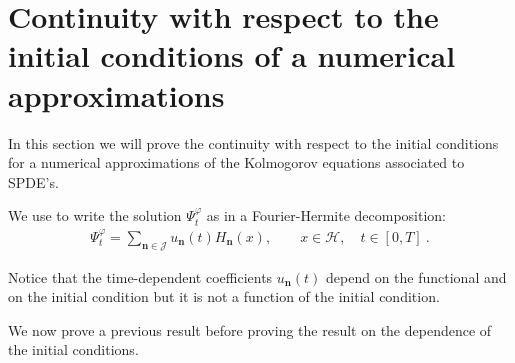 \documentclass[review, onefignum, onetabnum]{siamart171218}
\begin{document}
\section{Continuity with respect to the initial conditions of a numerical
approximations }
\label{sec:ContinuityRespectToInitialConditions}

In this section we will prove the continuity with respect to the initial
conditions for a numerical approximations
of the Kolmogorov equations associated to SPDE's.

We use  to write the solution $\Psi_t^\varphi$ as in a
Fourier-Hermite decomposition:
\begin{align}
    \Psi_t ^ \varphi=
        \sum_{\bm{n}\in \mathcal{J}}
        u_{\bm{n}}(t) H_{\bm{n}}(x),
        \qquad
        x \in \mathcal{H},
        \quad t \in [0,T] \ .
        \label{num-approx}
\end{align}

Notice that the time-dependent coefficients $ u_{\bm{n}}(t)$ depend on the
functional and on the initial condition but it is not a function of
the initial condition.

We now prove a previous result before proving the result on the dependence of
the initial conditions.
\end{document}

